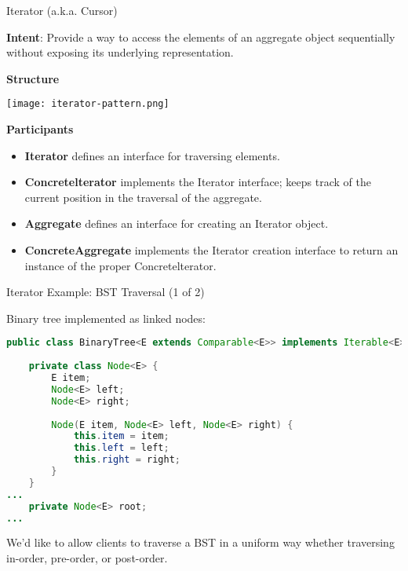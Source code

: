 \documentclass{beamer}
\begin{document}
\begin{frame}[fragile]{Iterator (a.k.a. Cursor)}

\vspace{-.05in}
{\bf Intent}: Provide a way to access the elements of an aggregate object sequentially without exposing its underlying representation.

{\bf Structure}
\vspace{-.05in}
\begin{center}
\texttt{[image: iterator-pattern.png]}\\
\end{center}
\vspace{-.125in}
{\bf Participants}
\begin{itemize}
\item {\bf Iterator} defines an interface for traversing elements.
\item {\bf Concretelterator} implements the Iterator interface; keeps track of the current position in the traversal of the aggregate.
\item {\bf Aggregate} defines an interface for creating an Iterator object.
\item {\bf ConcreteAggregate} implements the Iterator creation interface to return an instance of the proper Concretelterator.
\end{itemize}


\end{frame}

\begin{frame}[fragile]{Iterator Example: BST Traversal (1 of 2)}


Binary tree implemented as linked nodes:
\begin{lstlisting}[language=Java]
public class BinaryTree<E extends Comparable<E>> implements Iterable<E> {
    
    private class Node<E> {
        E item;
        Node<E> left;
        Node<E> right;
        
        Node(E item, Node<E> left, Node<E> right) {
            this.item = item;
            this.left = left;
            this.right = right;
        }
    }
...    
    private Node<E> root;
...
\end{lstlisting}

We'd like to allow clients to traverse a BST in a uniform way whether traversing in-order, pre-order, or post-order.

\end{frame}
\end{document}
